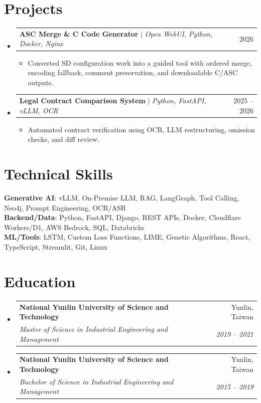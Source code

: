 \documentclass[letterpaper,11pt]{article}
\makeatletter
\newcommand{\resumeItem}[1]{
  \item\small{
    {#1 \vspace{-2pt}}
  }
}
\newcommand{\resumeSubheading}[4]{
  \vspace{-2pt}\item
    \begin{tabular*}{0.97\textwidth}[t]{l@{\extracolsep{\fill}}r}
      \textbf{#1} & #2 \\
      \textit{\small#3} & \textit{\small #4} \\
    \end{tabular*}\vspace{-7pt}
}
\newcommand{\resumeProjectHeading}[2]{
    \item
    \begin{tabular*}{0.97\textwidth}{l@{\extracolsep{\fill}}r}
      \small#1 & #2 \\
    \end{tabular*}\vspace{-7pt}
}
\newcommand{\resumeSubHeadingListStart}{\begin{itemize}[leftmargin=0.15in, label={}, itemsep=0pt]}
\newcommand{\resumeSubHeadingListEnd}{\end{itemize}}
\newcommand{\resumeItemListStart}{\begin{itemize}[itemsep=0pt]}
\newcommand{\resumeItemListEnd}{\end{itemize}\vspace{-5pt}}
\makeatother
\begin{document}
\section{Projects}
    \resumeSubHeadingListStart
      \resumeProjectHeading
          {\textbf{ASC Merge \& C Code Generator} $|$ \emph{Open WebUI, Python, Docker, Nginx}}{2026}
          \resumeItemListStart
            \resumeItem{Converted SD configuration work into a guided tool with ordered merge, encoding fallback, comment preservation, and downloadable C/ASC outputs.}
          \resumeItemListEnd

      \resumeProjectHeading
          {\textbf{Legal Contract Comparison System} $|$ \emph{Python, FastAPI, vLLM, OCR}}{2025 -- 2026}
          \resumeItemListStart
            \resumeItem{Automated contract verification using OCR, LLM restructuring, omission checks, and diff review.}
          \resumeItemListEnd
    \resumeSubHeadingListEnd

\section{Technical Skills}
 \begin{itemize}[leftmargin=0.15in, label={}]
    \small{\item{
     \textbf{Generative AI}{: vLLM, On-Premise LLM, RAG, LangGraph, Tool Calling, Neo4j, Prompt Engineering, OCR/ASR} \\
     \textbf{Backend/Data}{: Python, FastAPI, Django, REST APIs, Docker, Cloudflare Workers/D1, AWS Bedrock, SQL, Databricks} \\
     \textbf{ML/Tools}{: LSTM, Custom Loss Functions, LIME, Genetic Algorithms, React, TypeScript, Streamlit, Git, Linux}
    }}
 \end{itemize}

\section{Education}
  \resumeSubHeadingListStart
    \resumeSubheading
      {National Yunlin University of Science and Technology}{Yunlin, Taiwan}
      {Master of Science in Industrial Engineering and Management}{2019 -- 2021}
    \resumeSubheading
      {National Yunlin University of Science and Technology}{Yunlin, Taiwan}
      {Bachelor of Science in Industrial Engineering and Management}{2015 -- 2019}
  \resumeSubHeadingListEnd
\end{document}

